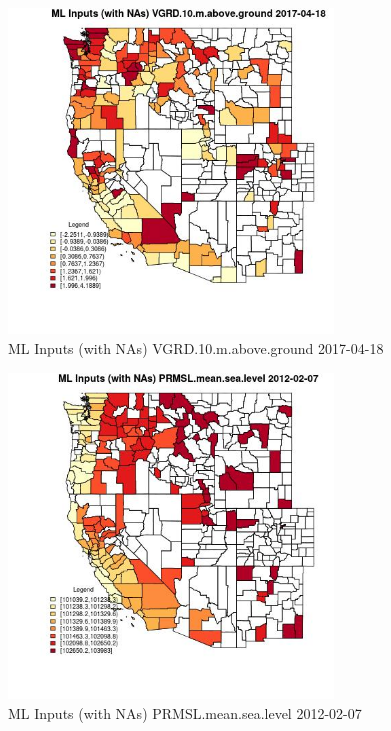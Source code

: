 \begin{figure} 
\centering  
\includegraphics[width=0.77\textwidth]{Code_Outputs/Report_ML_input_PM25_Step4_part_f_de_duplicated_aves_prioritize_24hr_obswNAs_CountyVGRD10mabovegroundMean2017-04-18.jpg} 
\caption{\label{fig:Report_ML_input_PM25_Step4_part_f_de_duplicated_aves_prioritize_24hr_obswNAsCountyVGRD10mabovegroundMean2017-04-18}ML Inputs (with NAs) VGRD.10.m.above.ground 2017-04-18} 
\end{figure} 
 

\begin{figure} 
\centering  
\includegraphics[width=0.77\textwidth]{Code_Outputs/Report_ML_input_PM25_Step4_part_f_de_duplicated_aves_prioritize_24hr_obswNAs_CountyPRMSLmeansealevelMean2012-02-07.jpg} 
\caption{\label{fig:Report_ML_input_PM25_Step4_part_f_de_duplicated_aves_prioritize_24hr_obswNAsCountyPRMSLmeansealevelMean2012-02-07}ML Inputs (with NAs) PRMSL.mean.sea.level 2012-02-07} 
\end{figure} 
 

